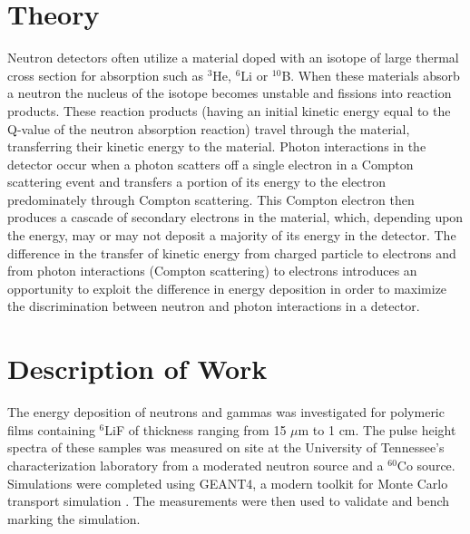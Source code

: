 \documentclass{anstrans}
\newcommand{\iso}[2]{${}^{#2}${#1}}
\newcommand{\micron}{$\mu$m }
\begin{document}
\section{Theory}
Neutron detectors often utilize a material doped with an isotope of large thermal cross section for absorption such as \iso{He}{3}, \iso{Li}{6} or \iso{B}{10}. 
When these materials absorb a neutron the nucleus of the isotope becomes unstable and fissions into reaction products.
These reaction products (having an initial kinetic energy equal to the Q-value of the neutron absorption reaction) travel through the material, transferring their kinetic energy to the material.
Photon interactions in the detector occur when a photon scatters off a single electron in a Compton scattering event and transfers a portion of its energy to the electron predominately through Compton scattering.
This Compton electron then produces a cascade of secondary electrons in the material, which, depending upon the energy, may or may not deposit a majority of its energy in the detector.
The difference in the transfer of kinetic energy from charged particle to electrons and from photon interactions (Compton scattering) to electrons introduces an opportunity to exploit the difference in energy deposition in order to maximize the discrimination between neutron and photon interactions in a detector.

\section{Description of Work}
The energy deposition of neutrons and gammas was investigated for polymeric films containing \iso{LiF}{6} of thickness ranging from 15 \micron to 1 cm.
The pulse height spectra of these samples was measured on site at the University of Tennessee's characterization laboratory from a moderated neutron source and a \iso{Co}{60} source.
Simulations were completed using GEANT4, a modern toolkit for Monte Carlo transport simulation \cite{agostinelli_geant4simulation_2003,allison_geant4_2006}.
The measurements were then used to validate and bench marking the simulation.
\end{document}
